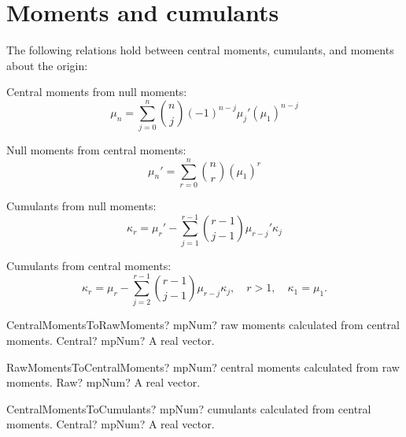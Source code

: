 \section{Moments and cumulants}
\label{Moments and cumulants}

The following relations hold between central moments, cumulants, and moments about the origin:

Central moments from null moments: 
\begin{equation}
	\mu_n = \sum_{j=0}^n \binom{n}{j} (-1)^{n-j} \mu_j'(\mu_1)^{n-j}
\end{equation}


Null moments from central moments: 
\begin{equation}
	\mu_n' = \sum_{r=0}^n \binom{n}{r} (\mu_1)^{r}
\end{equation}


Cumulants  from null moments: 
\begin{equation}
	\kappa_r = \mu_r' - \sum_{j=1}^{r-1} \binom{r-1}{j-1} \mu_{r-j}' \kappa_j
\end{equation}


Cumulants  from central moments: 
\begin{equation}
	\kappa_r = \mu_r - \sum_{j=2}^{r-1} \binom{r-1}{j-1} \mu_{r-j} \kappa_j, \quad r>1, \quad \kappa_1=\mu_1.
\end{equation}



\vspace{0.6cm}

\begin{mpFunctionsExtract}
	\mpFunctionOneNotImplemented
	{CentralMomentsToRawMoments? mpNum? raw moments calculated from central moments.}
	{Central? mpNum? A real vector.}
\end{mpFunctionsExtract}


\vspace{0.6cm}

\begin{mpFunctionsExtract}
	\mpFunctionOneNotImplemented
	{RawMomentsToCentralMoments? mpNum? central moments calculated from raw moments.}
	{Raw? mpNum? A real vector.}
\end{mpFunctionsExtract}


\vspace{0.6cm}

\begin{mpFunctionsExtract}
	\mpFunctionOneNotImplemented
	{CentralMomentsToCumulants? mpNum? cumulants calculated from central moments.}
	{Central? mpNum? A real vector.}
\end{mpFunctionsExtract}


